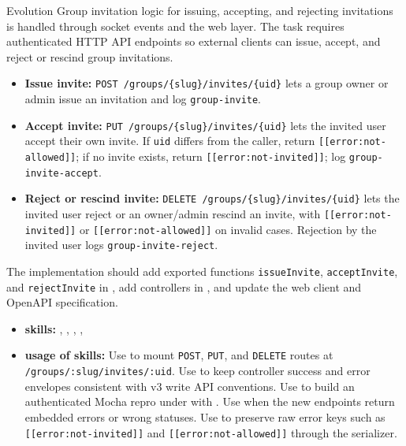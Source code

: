 \begin{svpromptbox}{Evolution}
Group invitation logic for issuing, accepting, and rejecting invitations is handled through socket events and the web layer. The task requires authenticated HTTP API endpoints so external clients can issue, accept, and reject or rescind group invitations.

\begin{itemize}
    \item \textbf{Issue invite:} \texttt{POST /groups/\{slug\}/invites/\{uid\}} lets a group owner or admin issue an invitation and log \texttt{group-invite}.
    \item \textbf{Accept invite:} \texttt{PUT /groups/\{slug\}/invites/\{uid\}} lets the invited user accept their own invite. If \texttt{uid} differs from the caller, return \texttt{[[error:not-allowed]]}; if no invite exists, return \texttt{[[error:not-invited]]}; log \texttt{group-invite-accept}.
    \item \textbf{Reject or rescind invite:} \texttt{DELETE /groups/\{slug\}/invites/\{uid\}} lets the invited user reject or an owner/admin rescind an invite, with \texttt{[[error:not-invited]]} or \texttt{[[error:not-allowed]]} on invalid cases. Rejection by the invited user logs \texttt{group-invite-reject}.
\end{itemize}
The implementation should add exported functions \texttt{issueInvite}, \texttt{acceptInvite}, and \texttt{rejectInvite} in , add controllers in , and update the web client and OpenAPI specification.

\svpartsep
{}
\begin{itemize}
    \item \textbf{skills:} , , , , 
    \item \textbf{usage of skills:} Use  to mount \texttt{POST}, \texttt{PUT}, and \texttt{DELETE} routes at \texttt{/groups/:slug/invites/:uid}. Use  to keep controller success and error envelopes consistent with v3 write API conventions. Use  to build an authenticated Mocha repro under  with . Use  when the new endpoints return embedded errors or wrong statuses. Use  to preserve raw error keys such as \texttt{[[error:not-invited]]} and \texttt{[[error:not-allowed]]} through the serializer.
\end{itemize}


\end{svpromptbox}
